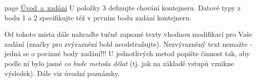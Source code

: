 
\begin{DoxyRefList}
\item[page \mbox{\hyperlink{index}{Úvod a zadání}} ]\label{todo__todo000001}%
%
U položky 3 definujte chování kontejneru. Datové typy z bodu 1 a 2 specifikujte též v prvním bodu zadání kontejneru.

\label{todo__todo000002}%
%
Od tohoto místa dále nahraďte tučně zapsané texty vhodnou modifikací pro Vaše zadání (značky pro zvýraznění bold neodstraňujte). Nezvýrazněný text nemažte -\/ jedná se o povinné body zadání!!! U jednotlivých metod popište činnost tak, aby podle ní bylo jasné {\itshape co bude metoda dělat} (tj. jak na základě vstupů vznikne výsledek). Dále viz úvodní poznámky.
\end{DoxyRefList}